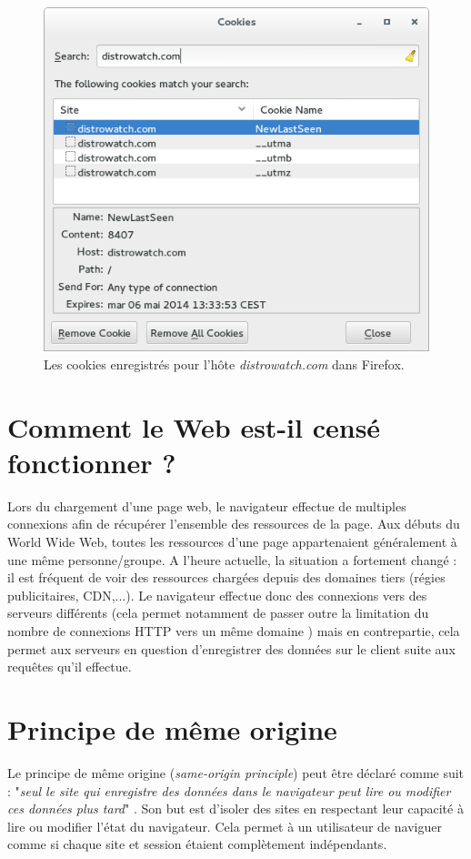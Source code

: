 \begin{figure}[h]
	\centering
	\includegraphics[scale=0.7]{figures/cookies_distrowatch.png}
	\caption{\label{cookies_distrowatch}Les cookies enregistrés pour l'hôte \textit{distrowatch.com} dans Firefox.}
\end{figure}


\section{Comment le Web est-il censé fonctionner ?}
Lors du chargement d'une page web, le navigateur effectue de multiples connexions afin de récupérer l'ensemble des ressources de la page. Aux débuts du World Wide Web, toutes les ressources d'une page appartenaient généralement à une même personne/groupe. A l'heure actuelle, la situation a fortement changé : il est fréquent de voir des ressources chargées depuis des domaines tiers (régies publicitaires, CDN,...). Le navigateur effectue donc des connexions vers des serveurs différents (cela permet notamment de passer outre la limitation du nombre de connexions HTTP vers un même domaine \cite{IETF_RFC2616}) mais en contrepartie, cela permet aux serveurs en question d'enregistrer des données sur le client suite aux requêtes qu'il effectue.


\section{Principe de même origine}
Le principe de même origine (\textit{same-origin principle}) peut être déclaré comme suit : "\textit{seul le site qui enregistre des données dans le navigateur peut lire ou modifier ces données plus tard}" \cite{Jackson:2006:PBS:1135777.1135884}. Son but est d'isoler des sites en respectant leur capacité à lire ou modifier l'état du navigateur. Cela permet à un utilisateur de naviguer comme si chaque site et session étaient complètement indépendants.
\newline

